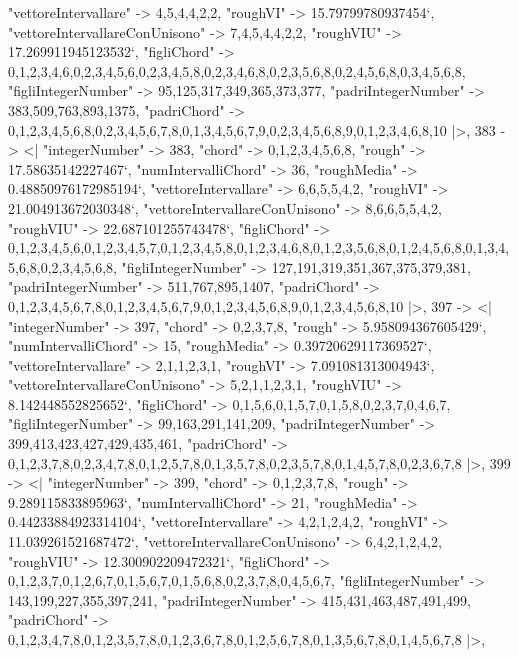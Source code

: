 \documentclass[
]{article}
\begin{document}
\begin{DatasetVerbatim}
    "vettoreIntervallare" -> {4,5,4,4,2,2},
    "roughVI" -> 15.79799780937454`,
    "vettoreIntervallareConUnisono" -> {7,4,5,4,4,2,2},
    "roughVIU" -> 17.269911945123532`,
    "figliChord" -> {{0,1,2,3,4,6},{0,2,3,4,5,6},{0,2,3,4,5,8},{0,2,3,4,6,8},{0,2,3,5,6,8},{0,2,4,5,6,8},{0,3,4,5,6,8}},
    "figliIntegerNumber" -> {95,125,317,349,365,373,377},
    "padriIntegerNumber" -> {383,509,763,893,1375},
    "padriChord" -> {{0,1,2,3,4,5,6,8},{0,2,3,4,5,6,7,8},{0,1,3,4,5,6,7,9},{0,2,3,4,5,6,8,9},{0,1,2,3,4,6,8,10}}
  |>,
  383 -> <|
    "integerNumber" -> 383,
    "chord" -> {0,1,2,3,4,5,6,8},
    "rough" -> 17.58635142227467`,
    "numIntervalliChord" -> 36,
    "roughMedia" -> 0.48850976172985194`,
    "vettoreIntervallare" -> {6,6,5,5,4,2},
    "roughVI" -> 21.004913672030348`,
    "vettoreIntervallareConUnisono" -> {8,6,6,5,5,4,2},
    "roughVIU" -> 22.687101255743478`,
    "figliChord" -> {{0,1,2,3,4,5,6},{0,1,2,3,4,5,7},{0,1,2,3,4,5,8},{0,1,2,3,4,6,8},{0,1,2,3,5,6,8},{0,1,2,4,5,6,8},{0,1,3,4,5,6,8},{0,2,3,4,5,6,8}},
    "figliIntegerNumber" -> {127,191,319,351,367,375,379,381},
    "padriIntegerNumber" -> {511,767,895,1407},
    "padriChord" -> {{0,1,2,3,4,5,6,7,8},{0,1,2,3,4,5,6,7,9},{0,1,2,3,4,5,6,8,9},{0,1,2,3,4,5,6,8,10}}
  |>,
  397 -> <|
    "integerNumber" -> 397,
    "chord" -> {0,2,3,7,8},
    "rough" -> 5.958094367605429`,
    "numIntervalliChord" -> 15,
    "roughMedia" -> 0.39720629117369527`,
    "vettoreIntervallare" -> {2,1,1,2,3,1},
    "roughVI" -> 7.091081313004943`,
    "vettoreIntervallareConUnisono" -> {5,2,1,1,2,3,1},
    "roughVIU" -> 8.142448552825652`,
    "figliChord" -> {{0,1,5,6},{0,1,5,7},{0,1,5,8},{0,2,3,7},{0,4,6,7}},
    "figliIntegerNumber" -> {99,163,291,141,209},
    "padriIntegerNumber" -> {399,413,423,427,429,435,461},
    "padriChord" -> {{0,1,2,3,7,8},{0,2,3,4,7,8},{0,1,2,5,7,8},{0,1,3,5,7,8},{0,2,3,5,7,8},{0,1,4,5,7,8},{0,2,3,6,7,8}}
  |>,
  399 -> <|
    "integerNumber" -> 399,
    "chord" -> {0,1,2,3,7,8},
    "rough" -> 9.289115833895963`,
    "numIntervalliChord" -> 21,
    "roughMedia" -> 0.44233884923314104`,
    "vettoreIntervallare" -> {4,2,1,2,4,2},
    "roughVI" -> 11.039261521687472`,
    "vettoreIntervallareConUnisono" -> {6,4,2,1,2,4,2},
    "roughVIU" -> 12.300902209472321`,
    "figliChord" -> {{0,1,2,3,7},{0,1,2,6,7},{0,1,5,6,7},{0,1,5,6,8},{0,2,3,7,8},{0,4,5,6,7}},
    "figliIntegerNumber" -> {143,199,227,355,397,241},
    "padriIntegerNumber" -> {415,431,463,487,491,499},
    "padriChord" -> {{0,1,2,3,4,7,8},{0,1,2,3,5,7,8},{0,1,2,3,6,7,8},{0,1,2,5,6,7,8},{0,1,3,5,6,7,8},{0,1,4,5,6,7,8}}
  |>,

\end{DatasetVerbatim}
\end{document}

